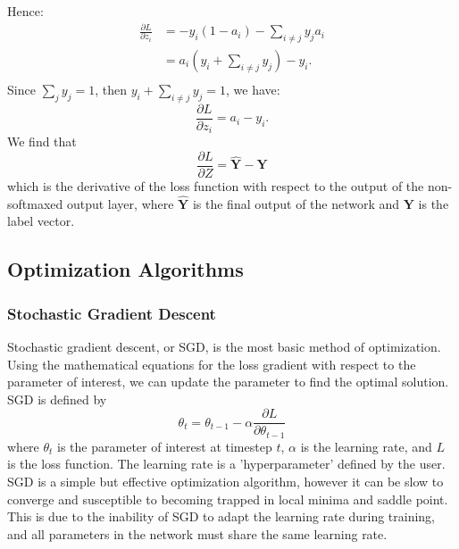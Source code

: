 \documentclass[twocolumn,pra,floatfix]{revtex4-2}
\begin{document}
                Hence:
                \begin{align*}
                    \frac{\partial L}{\partial z_{i}} &= -y_{i}(1-a_{i}) - \sum_{i \neq j}y_{j}a_{i}\\
                                                &= a_{i} \left( y_{i} + \sum_{i \neq j}y_{j} \right) - y_{i} .\\
                \end{align*}
                Since $\sum_{j}y_{j} = 1$, then $y_{i} + \sum_{i \neq j}y_{j} = 1$, we have:
                \begin{equation}
                    \frac{\partial L
                    }{\partial z_{i}} = a_{i} - y_{i}.
                \end{equation}
                We find that
                \begin{equation}
                    \frac{\partial L}{\partial 
                    Z} = \mathbf{\hat{Y}} - \mathbf{Y}
                \end{equation}
                which is the derivative of the loss function with respect to the output of the non-softmaxed output layer, where $\mathbf{\hat{Y}}$ is the final output of the network and $\mathbf{Y}$ is the label vector.
                
        \subsection{Optimization Algorithms}

            \subsubsection{Stochastic Gradient Descent}

                Stochastic gradient descent, or SGD, is the most basic method of optimization. Using the mathematical equations for the loss gradient with respect to the parameter of interest, we can update the parameter to find the optimal solution. SGD is defined by
                \begin{equation}
                    \theta_t = \theta_{t-1} - \alpha \frac{\partial L}{\partial \theta_{t-1}}
                \end{equation}
                where $\theta_t$ is the parameter of interest at timestep $t$, $\alpha$ is the learning rate, and $L$ is the loss function. The learning rate is a 'hyperparameter' defined by the user. SGD is a simple but effective optimization algorithm, however it can be slow to converge and susceptible to becoming trapped in local minima and saddle point. This is due to the inability of SGD to adapt the learning rate during training, and all parameters in the network must share the same learning rate.
\end{document}
